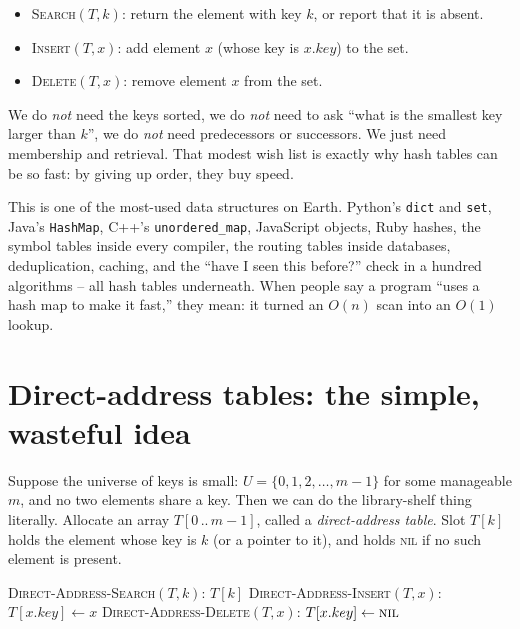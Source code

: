 \begin{itemize}
  \item \textsc{Search}$(T, k)$: return the element with key $k$, or report that it is absent.
  \item \textsc{Insert}$(T, x)$: add element $x$ (whose key is $x.key$) to the set.
  \item \textsc{Delete}$(T, x)$: remove element $x$ from the set.
\end{itemize}

We do \emph{not} need the keys sorted, we do \emph{not} need to ask ``what is the smallest key larger than $k$'', we do \emph{not} need predecessors or successors. We just need membership and retrieval. That modest wish list is exactly why hash tables can be so fast: by giving up order, they buy speed.

\begin{aestheticbox}
This is one of the most-used data structures on Earth. Python's \lstinline|dict| and \lstinline|set|, Java's \lstinline|HashMap|, C++'s \lstinline|unordered_map|, JavaScript objects, Ruby hashes, the symbol tables inside every compiler, the routing tables inside databases, deduplication, caching, and the ``have I seen this before?'' check in a hundred algorithms -- all hash tables underneath. When people say a program ``uses a hash map to make it fast,'' they mean: it turned an $O(n)$ scan into an $O(1)$ lookup.
\end{aestheticbox}

\section{Direct-address tables: the simple, wasteful idea}

Suppose the universe of keys is small: $U = \{0, 1, 2, \dots, m-1\}$ for some manageable $m$, and no two elements share a key. Then we can do the library-shelf thing literally. Allocate an array $T[0\,..\,m-1]$, called a \emph{direct-address table}. Slot $T[k]$ holds the element whose key is $k$ (or a pointer to it), and holds \textsc{nil} if no such element is present.

\begin{algorithm}[H]
\caption{Direct-address operations}
\textsc{Direct-Address-Search}$(T,k)$: \Return $T[k]$\;
\textsc{Direct-Address-Insert}$(T,x)$: $T[x.key] \gets x$\;
\textsc{Direct-Address-Delete}$(T,x)$: $T[x.key] \gets \textsc{nil}$\;
\end{algorithm}

